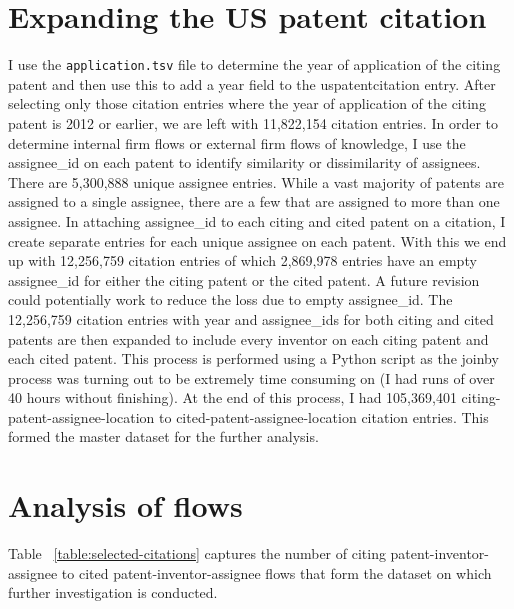\documentclass[12pt]{article}
\begin{document}
\section{Expanding the US patent citation}
I use the \verb|application.tsv| file to determine the year of application of the citing patent and then use this to add a year field to the uspatentcitation entry. After selecting only those citation entries where the year of application of the citing patent is 2012 or earlier, we are left with 11,822,154 citation entries. In order to determine internal firm flows or external firm flows of knowledge, I use the assignee\_id on each patent to identify similarity or dissimilarity of assignees. There are 5,300,888 unique assignee entries. While a vast majority of patents are assigned to a single assignee, there are a few that are assigned to more than one assignee. In attaching assignee\_id to each citing and cited patent on a citation, I create separate entries for each unique assignee on each patent. With this we end up with 12,256,759 citation entries of which 2,869,978 entries have an empty assignee\_id for either the citing patent or the cited patent. A future revision could potentially work to reduce the loss due to empty assignee\_id. The 12,256,759 citation entries with year and assignee\_ids for both citing and cited patents are then expanded to include every inventor on each citing patent and each cited patent. This process is performed using a Python script as the joinby process was turning out to be extremely time consuming on \stata (I had runs of over 40 hours without \stata finishing). At the end of this process, I had 105,369,401 citing-patent-assignee-location to cited-patent-assignee-location citation entries. This formed the master dataset for the further analysis.

\section{Analysis of flows}\label{S:Analysis}
Table ~\ref{table:selected-citations} captures the number of citing patent-inventor-assignee to cited patent-inventor-assignee flows that form the dataset on which further investigation is conducted. 
\end{document}
